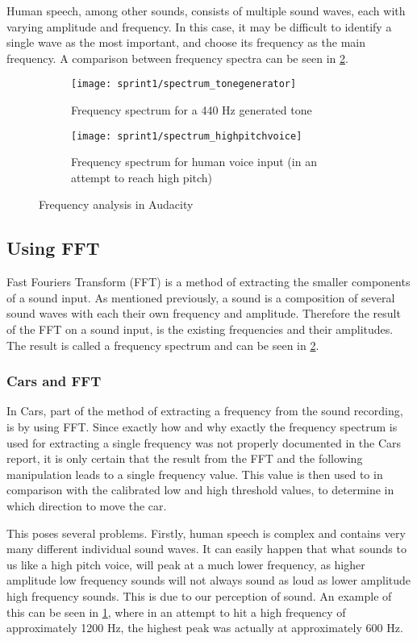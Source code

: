 Human speech, among other sounds, consists of multiple sound waves, each with varying amplitude and frequency.
In this case, it may be difficult to identify a single wave as the most important, and choose its frequency as the main frequency.
A comparison between frequency spectra can be seen in \cref{fig:frequency_spectra}.

\begin{figure}[h]
\centering
\begin{subfigure}[t]{.45\textwidth}
\texttt{[image: sprint1/spectrum\_tonegenerator]}
\caption{Frequency spectrum for a 440 Hz generated tone}
\end{subfigure}
\begin{subfigure}[t]{.45\textwidth}
\texttt{[image: sprint1/spectrum\_highpitchvoice]}
\caption{Frequency spectrum for human voice input (in an attempt to reach high pitch)}
\label{fig:humanvoice_spectra}
\end{subfigure}
\caption{Frequency analysis in Audacity}
\label{fig:frequency_spectra}
\end{figure}

\subsection{Using FFT}
Fast Fouriers Transform (FFT) is a method of extracting the smaller components of a sound input.
As mentioned previously, a sound is a composition of several sound waves with each their own frequency and amplitude.
Therefore the result of the FFT on a sound input, is the existing frequencies and their amplitudes.
The result is called a frequency spectrum and can be seen in \cref{fig:frequency_spectra}.

\subsubsection{Cars and FFT}
In Cars, part of the method of extracting a frequency from the sound recording, is by using FFT.
Since exactly how and why exactly the frequency spectrum is used for extracting a single frequency was not properly documented in the Cars report, it is only certain that the result from the FFT and the following manipulation leads to a single frequency value.
This value is then used to in comparison with the calibrated low and high threshold values, to determine in which direction to move the car.

This poses several problems.
Firstly, human speech is complex and contains very many different individual sound waves.
It can easily happen that what sounds to us like a high pitch voice, will peak at a much lower frequency, as higher amplitude low frequency sounds will not always sound as loud as lower amplitude high frequency sounds.
This is due to our perception of sound.
An example of this can be seen in \cref{fig:humanvoice_spectra}, where in an attempt to hit a high frequency of approximately 1200 Hz, the highest peak was actually at approximately 600 Hz.

